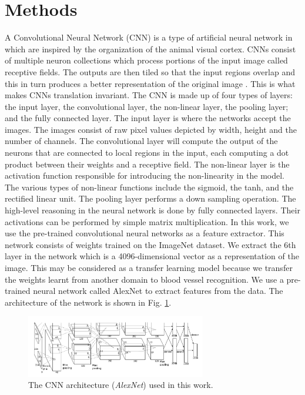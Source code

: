 \section{Methods}

A Convolutional Neural Network (CNN) is a type of artificial neural network in which are inspired by the organization of the animal visual cortex. CNNs consist of multiple neuron collections which process portions of the input image called receptive fields. The outputs are then tiled so that the input regions overlap and this in turn produces a better representation of the original image \cite{krizhevsky2012imagenet}. This is what makes CNNs translation invariant. 
The CNN is made up of four types of layers: the input layer, the convolutional layer, the non-linear layer, the pooling layer; and the fully connected layer. The input layer is where the networks accept the images.  The images consist of raw pixel values depicted by width, height and the number of channels.  The convolutional layer will compute the output of the neurons that are connected to local regions in the input, each computing a dot product between their weights and a receptive field. The non-linear layer is the activation function responsible for introducing the non-linearity in the model. The various types of non-linear functions include the sigmoid, the tanh, and the rectified linear unit. The pooling layer performs a down sampling operation. The high-level reasoning in the neural network is done by fully connected layers.  Their activations can be performed by simple matrix multiplication.
In this work, we use the pre-trained convolutional neural networks as a feature extractor. This network consists of weights trained on the ImageNet \cite{deng2009imagenet} dataset. We extract the 6th layer in the network which is a 4096-dimensional vector as a representation of the image. This may be considered as a transfer learning model because we transfer the weights learnt from another domain to blood vessel recognition. We use a pre-trained neural network called AlexNet \cite{krizhevsky2012imagenet} to extract features from the data. The architecture of the network is shown in Fig. \ref{fig:alexnet}.

\begin{figure}[ht!]
\centering
\includegraphics[width=0.7\textwidth]{img/alexnet}
\caption{The CNN architecture (\textit{AlexNet}) used in this work.}
\label{fig:alexnet}
\end{figure} 

